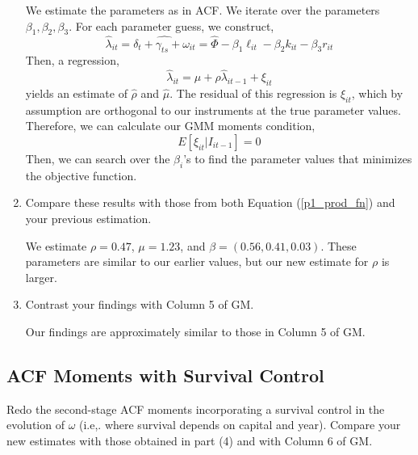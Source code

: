 \documentclass{article}
\begin{document}
\begin{enumerate}
 \begin{answer}
We estimate the parameters as in ACF. We iterate over the parameters $\beta_1, \beta_2, \beta_3$. For each parameter guess, we construct,
$$\hat{\lambda}_{it} = \widehat{\delta_t + \gamma_{ts} + \omega_{it}} = \hat{\Phi} - \beta_1 \ell_{it} - \beta_2 k_{it} - \beta_3 r_{it}$$
Then, a regression,
$$\hat{\lambda}_{it} = \mu + \rho \hat{\lambda}_{it-1} + \xi_{it}$$
yields an estimate of $\hat{\rho}$ and $\hat{\mu}$. The residual of this regression is $\xi_{it}$, which by assumption are orthogonal to our instruments at the true parameter values. Therefore, we can calculate our GMM moments condition,
$$E[\xi_{it}|I_{it-1}] = 0$$
Then, we can search over the $\beta_i$'s to find the parameter values that minimizes the objective function.
 \end{answer}


\item Compare these results with those from both Equation (\ref{p1_prod_fn}) and your previous
estimation.

\begin{answer}
We estimate $\rho=0.47$, $\mu=1.23$, and $\beta=(0.56, 0.41, 0.03)$. These parameters are similar to our earlier values, but our new estimate for $\rho$ is larger.
\end{answer}

\item Contrast your findings with Column 5 of GM.

\begin{answer}
Our findings are approximately similar to those in Column 5 of GM.
\end{answer}

\end{enumerate}


\subsection{ACF Moments with Survival Control}
Redo the second-stage ACF moments incorporating a survival control in the evolution of $\omega$ (i.e,. where survival depends on capital and year). Compare your new estimates with those obtained in part (4) and with Column 6 of GM.
\end{document}
